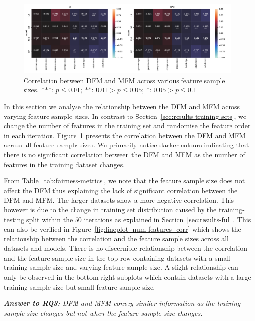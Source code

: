 \documentclass{article}
\newcommand{\highlight}[1]{\begin{framed}%
  \noindent\emph{#1}
\end{framed}}
\begin{document}
\begin{figure}
  \centering
  \includegraphics[width=0.95\linewidth]{heatmap--corr--num-features.pdf}
  \caption{Correlation between DFM and MFM across various feature
  sample sizes. ***: $p \le 0.01$; **: $0.01 > p \le 0.05$; *: $0.05
  > p \le 0.1$}
  \label{fig:heatmap--corr--num-features}
\end{figure}

In this section we analyse the relationship between the DFM and MFM
across varying feature sample sizes. In contrast to
Section \ref{sec:results-training-sets}, we change the number of
features in the training set and randomise the feature order in each
iteration. Figure \ref{fig:heatmap--corr--num-features} presents the
correlation between the DFM and MFM across all feature sample
sizes. We primarily notice darker colours indicating that there is no
significant correlation between the DFM and MFM as the number of
features in the training dataset changes.

From Table \ref{tab:fairness-metrics}, we note that the feature sample
size does not affect the DFM thus explaining the lack of significant
correlation between the DFM and MFM. The larger datasets show a more
negative correlation. This however is due to the change in training
set distribution caused by the training-testing split within the 50
iterations as explained in Section \ref{sec:results-full}. This can
also be verified in Figure \ref{fig:lineplot--num-features--corr}
which shows the relationship between the correlation and the feature
sample sizes across all datasets and models. There is no discernible
relationship between the correlation and the feature sample size in
the top row containing datasets with a small training sample size and
varying feature sample size. A slight relationship can only be
observed in the bottom right subplots which contain datasets with
a large training sample size but small feature sample size.

\highlight{\textbf{Answer to RQ3:} DFM and MFM convey similar
information as the training sample size changes but not when the
feature sample size changes.}
\end{document}
